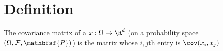 
\section*{Definition}

The covariance matrix of a $x: \Omega  \to \R ^d$ (on a probability space $(\Omega , \mathcal{F} , \mathbfsf{P} )$) is the matrix whose $i,j$th entry is $\cov(x_i,x_j)$
